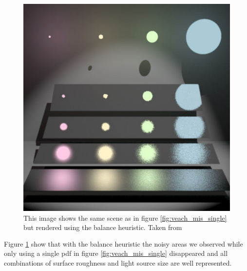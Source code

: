 \begin{figure}[h]
    \centering
    \includegraphics[width=.45\textwidth]{images/veach_mis_both.png}
    \caption{This image shows the same scene as in figure \ref{fig:veach_mis_single} but rendered using the balance heuristic. Taken from \cite[Figure~9.4]{veach-thesis}}
    \label{fig:veach_mis_balance}
\end{figure}

Figure \ref{fig:veach_mis_balance} show that with the balance heuristic the noisy areas we observed
while only using a single pdf in figure \ref{fig:veach_mis_single} disappeared
and all combinations of surface roughness and light source size are well represented.




